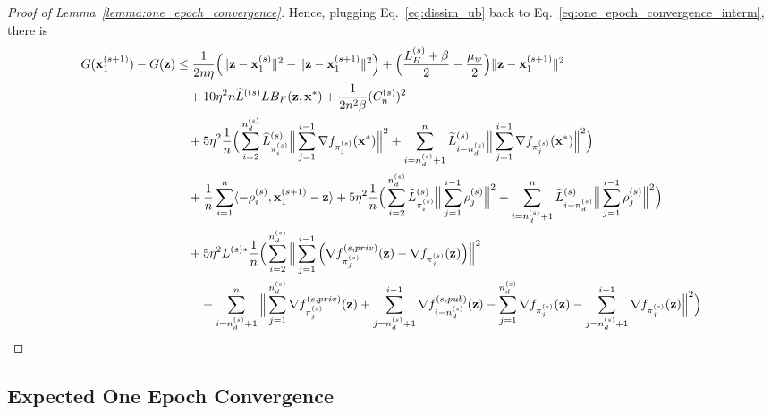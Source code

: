 \begin{proof}[Proof of Lemma~\ref{lemma:one_epoch_convergence}]
    Hence, plugging Eq.~\ref{eq:dissim_ub} back to Eq.~\ref{eq:one_epoch_convergence_interm}, there is
    \begin{align}
        G({\mathbf{x}}_1^{(s+1)}) - G({\mathbf{z}})
        &\leq \frac{1}{2 n \eta}\Big( \|{\mathbf{z}} - {\mathbf{x}}_1^{(s)}\|^2  - \|{\mathbf{z}} - {\mathbf{x}}_1^{(s+1)}\|^2 \Big)
        + \Big( \frac{L_H^{(s)} + \beta}{2} - \frac{\mu_{\psi}}{2} \Big)\| {\mathbf{z}} - {\mathbf{x}}_1^{(s+1)}\|^2
        \\
        \nonumber
        &\quad + 10 \eta^2 n \widehat{L}^{((s)} L B_F({\mathbf{z}}, {\mathbf{x}}^*) + \frac{1}{2n^2 \beta}(C_n^{(s)})^2 
 \\
        \nonumber
        &\quad
        + 5 \eta^2 \frac{1}{n} \Big(\sum_{i=2}^{n_d^{(s)}}\widehat{L}_{\pi_i^{(s)}}^{(s)}\Big\| \sum_{j=1}^{i-1} \nabla f_{\pi_j^{(s)}}({\mathbf{x}}^*)\Big\|^2
        + \sum_{i=n_d^{(s)}+1}^{n}\widetilde{L}_{i-n_d^{(s)}}^{(s)}\Big\| \sum_{j=1}^{i-1}\nabla f_{\pi_j^{(s)}}({\mathbf{x}}^*)\Big\|^2 \Big)\\
        \nonumber
        &\quad + \frac{1}{n}\sum_{i=1}^{n}\langle -\rho_i^{(s)}, {\mathbf{x}}_1^{(s+1)} - {\mathbf{z}}\rangle
        + 5\eta^2 \frac{1}{n} \Big( \sum_{i=2}^{n_d^{(s)}} \widehat{L}_{\pi_i^{(s)}}^{(s)} \Big\| \sum_{j=1}^{i-1} \rho_j^{(s)}\Big\|^2
        + \sum_{i=n_d^{(s)}+1}^{n} \widetilde{L}_{i-n_d^{(s)}}^{(s)}\Big\| \sum_{j=1}^{i-1} \rho_j^{(s)}\Big\|^2\Big)\\
    \nonumber
        &\quad + 5\eta^2 L^{(s)*} \frac{1}{n}\Big(\sum_{i=2}^{n_d^{(s)}}
        \Big\| \sum_{j=1}^{i-1} \Big( \nabla f_{\pi_j^{(s)}}^{(s, priv)}({\mathbf{z}}) - \nabla f_{\pi_j^{(s)}}({\mathbf{z}})\Big) \Big\|^2
        \\
        \nonumber
        &\quad \quad + \sum_{i=n_d^{(s)} + 1}^{n} \Big\| \sum_{j=1}^{n_d^{(s)}} \nabla f_{\pi_j^{(s)}}^{(s, priv)}({\mathbf{z}}) + \sum_{j=n_d^{(s)}+1}^{i-1} \nabla f_{i-n_d^{(s)}}^{(s, pub)}({\mathbf{z}})
            - \sum_{j=1}^{n_d^{(s)}} \nabla f_{\pi_j^{(s)}}({\mathbf{z}}) - \sum_{j=n_d^{(s)}+1}^{i-1} \nabla f_{\pi_j^{(s)}}({\mathbf{z}})
        \Big\|^2
        \Big)
    \end{align}

\end{proof}



\subsection{Expected One Epoch Convergence}
\label{subsec:appendix_expected_one_epoch_convergence}

